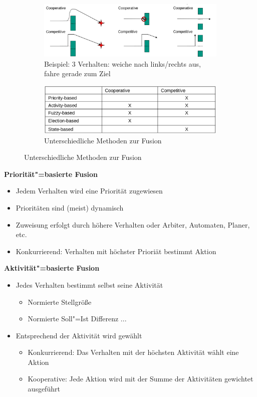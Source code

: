 \begin{figure}
	\centering
	\begin{subfigure}{.8\textwidth}
		\centering
		\includegraphics[width=\textwidth]{figures/fusion_beispiel.png}
		\caption{Beispiel: 3 Verhalten: weiche nach links/rechts aus, fahre gerade zum Ziel}
	\end{subfigure}\par\medskip
	\begin{subfigure}{.8\textwidth}
		\centering
		\includegraphics[width=\textwidth]{figures/fusion_methoden.png}
		\caption{Unterschiedliche Methoden zur Fusion}
	\end{subfigure}
	\label{ch:08:fig:fusion_beispiel}
\end{figure}

\textbf{Priorität"=basierte Fusion}
\begin{itemize}
	\item Jedem Verhalten wird eine Priorität zugewiesen
	\item Prioritäten sind (meist) dynamisch
	\item Zuweisung erfolgt durch höhere Verhalten oder Arbiter, Automaten, Planer, etc.
	\item Konkurrierend: Verhalten mit höchster Prioriät bestimmt Aktion
\end{itemize}

\textbf{Aktivität"=basierte Fusion}
\begin{itemize}
	\item Jedes Verhalten bestimmt selbst seine Aktivität
	\begin{itemize}
		\item Normierte Stellgröße
		\item Normierte Soll"=Ist Differenz ...
	\end{itemize}
	\item Entsprechend der Aktivität wird gewählt
	\begin{itemize}
		\item Konkurrierend: Das Verhalten mit der höchsten Aktivität wählt eine Aktion
		\item Kooperative: Jede Aktion wird mit der Summe der Aktivitäten gewichtet ausgeführt
	\end{itemize}
\end{itemize}


